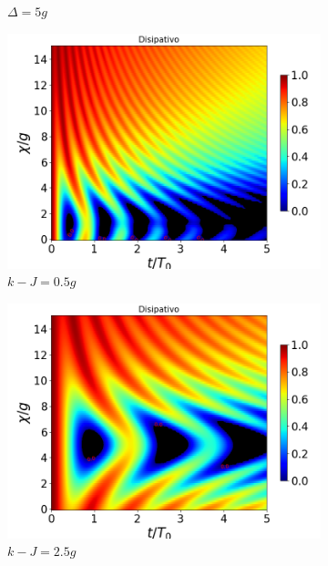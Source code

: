 \begin{figure}[h]
\begin{subfigure}{0.49\textwidth}
        \caption{$\Delta=5g$}
        \label{fig4:concu x d2}
    \end{subfigure}
    \vfill
    \begin{subfigure}{0.49\textwidth}
        \includegraphics[width=\textwidth]{figuras/ch4/concu/chi/eg0+ge0 d=0.0g k=0.5g J=0.0g gamma=0.25g concu chi dis.png}
        \caption{$k-J=0.5g$}
        \label{fig4:concu x k1}
    \end{subfigure}
    \hfill
    \begin{subfigure}{0.49\textwidth}
        \includegraphics[width=\textwidth]{figuras/ch4/concu/chi/eg0+ge0 d=0.0g k=2.5g J=0.0g gamma=0.25g concu chi dis.png}
        \caption{$k-J=2.5g$}
        \label{fig4:concu x k2}
    \end{subfigure}
    \caption{}
    \label{fig4:concu x params}
\end{figure}
